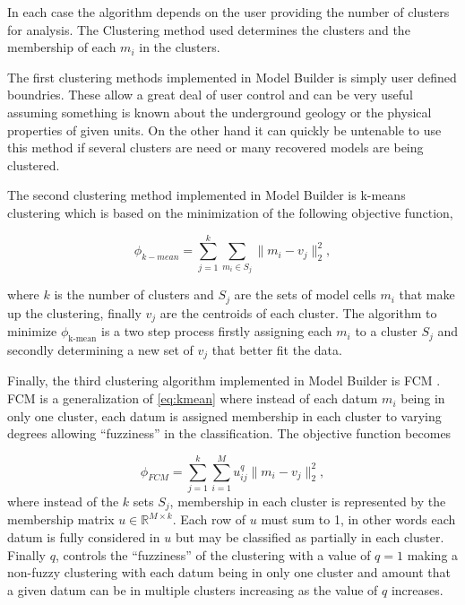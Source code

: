 In each case the algorithm depends on the user providing the number of clusters for analysis. The Clustering method used determines the clusters and the membership of each $m_i$ in the clusters.

The first clustering methods implemented in Model Builder is simply user defined boundries. These allow a great deal of user control and can be very useful assuming something is known about the underground geology or the physical properties of given units. On the other hand it can quickly be untenable to use this method if several clusters are need or many recovered models are being clustered.

The second clustering method implemented in Model Builder is k-means clustering \cite{gaf1984multivariate} which is based on the minimization of the following objective function,

\begin{equation}
 \phi_{k-mean} = \sum_{j=1}^k\sum_{m_i \in S_j}\|m_i - v_j\|_2^2,
\end{equation}
\label{eq:kmean}

where $k$ is the number of clusters and $S_j$ are the sets of model cells $m_i$ that make up the clustering, finally $v_j$ are the centroids of each cluster. The algorithm to minimize $\phi_{\text{k-mean}}$ is a two step process firstly assigning each $m_i$ to a cluster $S_j$ and secondly determining a new set of $v_j$ that better fit the data.

Finally, the third clustering algorithm implemented in Model Builder is \acf{FCM} \citep{sun2015multidomain}. \ac{FCM} is a generalization of \autoref{eq:kmean} where instead of each datum $m_i$ being in only one cluster, each datum is assigned membership in each cluster to varying degrees allowing ``fuzziness'' in the classification. The objective function becomes

\begin{equation}
 \phi_{FCM} = \sum_{j=1}^k\sum_{i = 1}^Mu^q_{ij}\|m_i - v_j\|_2^2,
\end{equation}
\label{eq:fcm}
where instead of the $k$ sets $S_j$, membership in each cluster is represented by the membership matrix $u \in \mathbb R^{M\times k}$. Each row of $u$ must sum to 1, in other words each datum is fully considered in $u$ but may be classified as partially in each cluster. Finally $q$, controls the ``fuzziness'' of the clustering with a value of $q = 1$ making a non-fuzzy clustering with each datum being in only one cluster and amount that a given datum can be in multiple clusters increasing as the value of $q$ increases. 

